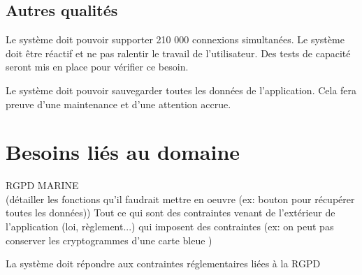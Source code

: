 \subsection{Autres qualités}

\begin{reqs}{Le système doit pouvoir supporter 210 000 connexions simultanées.}
Le système doit être réactif et ne pas ralentir le travail de l'utilisateur. Des tests de capacité seront mis en place pour vérifier ce besoin.
\end{reqs}

\begin{reqs}{Le système doit pouvoir sauvegarder toutes les données de l'application.}
Cela fera preuve d'une maintenance et d'une attention accrue.
\end{reqs}


\section{Besoins liés au domaine}
RGPD MARINE\\ (détailler les fonctions qu'il faudrait mettre en oeuvre (ex: bouton pour récupérer toutes les données))
Tout ce qui sont des contraintes venant de l'extérieur de l'application (loi, règlement...) qui imposent des contraintes
(ex: on peut pas conserver les cryptogrammes d'une carte bleue )

\begin{reqs}{La système doit répondre aux contraintes réglementaires liées à la RGPD}
\item 
\end{reqs}